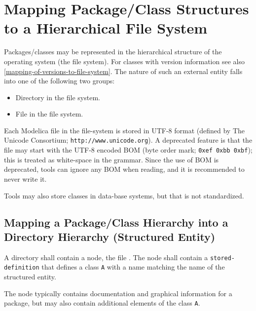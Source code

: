 \section{Mapping Package/Class Structures to a Hierarchical File System}\label{mapping-package-class-structures-to-a-hierarchical-file-system}

Packages/classes may be represented in the hierarchical structure of the
operating system (the file system). For classes with version
information see also \cref{mapping-of-versions-to-file-system}. The nature of such an external
entity falls into one of the following two groups:
\begin{itemize}
\item
  Directory in the file system.
\end{itemize}

\begin{itemize}
\item
  File in the file system.
\end{itemize}

Each Modelica file in the file-system is stored in UTF-8 format (defined by The Unicode Consortium; \lstinline!http://www.unicode.org!).  A deprecated feature is that the file may start with the UTF-8 encoded BOM (byte order mark; \lstinline!0xef 0xbb 0xbf!); this is treated as white-space in the grammar.  Since the use of BOM is deprecated, tools can ignore any BOM when reading, and it is recommended to never write it.

\begin{nonnormative}
Tools may also store classes in data-base systems, but that is not standardized.
\end{nonnormative}

\subsection{Mapping a Package/Class Hierarchy into a Directory Hierarchy (Structured Entity)}\label{mapping-a-package-class-hierarchy-into-a-directory-hierarchy-structured-entity}

A directory shall contain a node, the file .
The node shall contain a \lstinline[language=grammar]!stored-definition! that defines a class \lstinline!A! with a name matching the name of the structured entity.

\begin{nonnormative}
The node typically contains documentation and graphical information for a package, but may also contain additional elements of the class \lstinline!A!.
\end{nonnormative}

